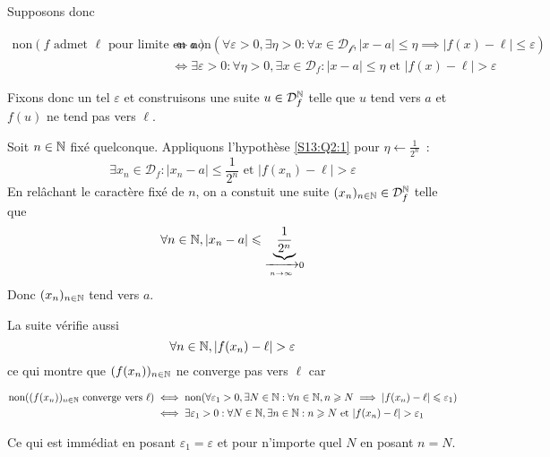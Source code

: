 \documentclass{article}
\renewenvironment{question_kholle}[2][ ]
{
	\subsection{\texorpdfstring{#2}{}}
	\notblank{#1}
	{
		\noindent #1
		\bigbreak
	}
	{}
	\begin{proof}
}
{
	\end{proof}
}
\begin{document}
\begin{question_kholle}
\begin{itemize}[label=$\star$]
		      Supposons donc

		      \begin{align}
			      \mathrm{non}(f \text{ admet }\ell \text{ pour limite en }a) & \iff \mathrm{non}(\forall \varepsilon>0, \exists \eta >0 : \forall x \in \mathcal{D_{f}}, \lvert x -a\rvert \leqslant \eta \implies \lvert f(x) - \ell \rvert\leqslant \varepsilon  ) \\
			                                                                  & \iff \exists \varepsilon>0 : \forall \eta >0, \exists x \in \mathcal{D}_{f} : \lvert x-a \rvert \leqslant \eta \text{ et } \lvert f(x) - \ell \rvert  > \varepsilon \label{S13:Q2:1}
		      \end{align}


		      Fixons donc un tel $\varepsilon$ et construisons une suite $u \in \mathcal{D}_{f}^{\mathbb N}$ telle que $u$ tend vers $a$ et $f(u)$ ne tend pas vers $\ell$.

		      Soit $n \in \mathbb N$ fixé quelconque. Appliquons l'hypothèse \eqref{S13:Q2:1} pour $\eta \leftarrow \frac{1}{2^{n}}$~:
		      $$
			      \exists x_{n} \in \mathcal{D}_{f} : \lvert x_{n} - a \rvert  \leqslant \frac{1}{2^{n}} \text{ et } \lvert f(x_{n}) - \ell \rvert  > \varepsilon
		      $$
		      En relâchant le caractère fixé de $n$, on a constuit une suite $(x_{n})_{n \in \mathbb N} \in \mathcal{D}_{f}^{\mathbb N}$ telle que
		      $$
			      \forall n \in \mathbb N, \lvert x_{n} - a \rvert \leqslant \underbrace{ \frac{1}{2^{n}} }_{ \xrightarrow[n \to \infty]{} 0}
		      $$
		      Donc $(x_{n})_{n \in \mathbb N}$ tend vers $a$.

		      La suite vérifie aussi
		      $$
			      \forall n \in \mathbb N, \lvert f(x_{n}) - \ell \rvert > \varepsilon
		      $$
		      ce qui montre que $(f(x_{n}))_{n \in \mathbb N}$ ne converge pas vers $\ell$ car

		      \begin{align*}
			      \text{non}((f(x_{n}))_{n \in \mathbb N} \text{ converge vers } \ell) & \iff \mathrm{non}(\forall \varepsilon_{1}>0, \exists N \in \mathbb N : \forall n \in \mathbb N, n \geqslant N \implies \lvert f(x_{n}) - \ell \rvert \leqslant \varepsilon_{1}) \\
			                                                                    & \iff \exists \varepsilon_{1}>0: \forall N \in \mathbb N, \exists n  \in \mathbb N : n\geqslant N \text{ et } \lvert f(x_{n}) - \ell \rvert  > \varepsilon_{1}
		      \end{align*}

		      Ce qui est immédiat en posant $\varepsilon_{1} = \varepsilon$ et pour n'importe quel $N$ en posant $n = N$.
	\end{itemize}
\end{question_kholle}
\end{document}
